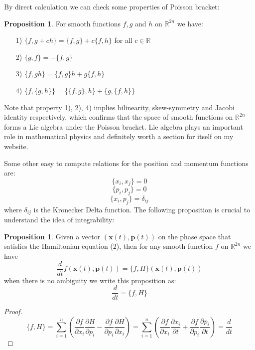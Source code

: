 \documentclass[]{article}
\theoremstyle{definition}
\newtheorem{proposition}[theorem]{Proposition}
\newcommand{\R}{\mathbb{R}}
\begin{document}
	By direct calculation we can check some properties of Poisson bracket: 
	\begin{proposition} For smooth functions $f,g$ and $h$ on $\R^{2n}$ we have: 
		\begin{enumerate}
			\item[1)] $\{f, g+ch\}=\{f,g\}+c\{f,h\}$ for all $c \in \R$ 
			\item[2)] $\{g,f\}=-\{f,g\}$
			\item[3)] $\{f,gh\}=\{f,g\}h + g\{f,h\}$
			\item[4)] $\{f,\{g,h\}\}=\{\{f,g\},h\}+\{g,\{f,h\}\}$
		\end{enumerate}
	\end{proposition}
	Note that property 1), 2), 4) implies bilinearity, skew-symmetry and Jacobi identity respectively, which confirms that the space of smooth functions on $\R^{2n}$ forms a Lie algebra under the Poisson bracket. Lie algebra plays an important role in mathematical physics and definitely worth a section for itself on my website.
	
	Some other easy to compute relations for the position and momentum functions are: 
	$$\{x_i,x_j\}=0$$
	$$\{p_i,p_j\}=0$$
 	$$\{x_i,p_j\}=\delta_{ij}$$
 	where $\delta_{ij}$ is the Kronecker Delta function. The following proposition is crucial to understand the idea of integrability:
	
	\begin{proposition}
		Given a vector $(\textbf{x}(t), \textbf{p}(t))$ on the phase space that satisfies the Hamiltonian equation (2), then for any smooth function $f$ on $\R^{2n}$ we have
		$$\frac{d}{dt}f(\textbf{x}(t), \textbf{p}(t))=\{f,H\}(\textbf{x}(t), \textbf{p}(t))$$
		when there is no ambiguity we write this proposition as: 
		\begin{equation}
			\frac{d}{dt}=\{f,H\}
		\end{equation}
	\end{proposition}

	\begin{proof}
		\begin{equation}
			\{f,H\}=\sum_{i=1}^{n}\left(\frac{\partial f}{\partial x_i}\frac{\partial H}{\partial p_i}-\frac{\partial f}{\partial p_i}\frac{\partial H}{\partial x_i}\right)=\sum_{i=1}^{n}\left(\frac{\partial f}{\partial x_i}\frac{\partial x_i}{\partial t} + \frac{\partial f}{\partial p_i}\frac{\partial p_i}{\partial t}\right)=\frac{d}{dt}
		\end{equation}
	\end{proof}
\end{document}
